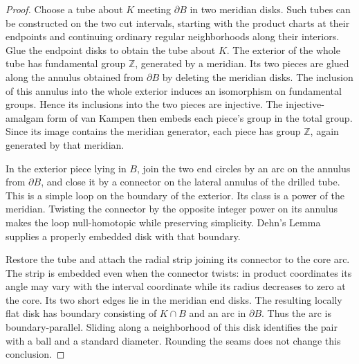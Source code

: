 \begin{proof}
Choose a tube about $K$ meeting $\partial B$ in two meridian disks.
Such tubes can be constructed on the two cut intervals, starting with
the product charts at their endpoints and continuing ordinary regular
neighborhoods along their interiors.  Glue the endpoint disks to obtain
the tube about $K$.  The exterior of the whole tube has fundamental
group $\mathbb Z$, generated by a meridian.  Its two pieces are glued
along the annulus obtained from $\partial B$ by deleting the meridian
disks.  The inclusion of this annulus into the whole exterior induces
an isomorphism on fundamental groups.  Hence its inclusions into the
two pieces are injective.  The injective-amalgam form of van Kampen
then embeds each piece's group in the total group.  Since its image
contains the meridian generator, each piece has group $\mathbb Z$,
again generated by that meridian.

In the exterior piece lying in $B$, join the two end circles by an arc
on the annulus from $\partial B$, and close it by a connector on the
lateral annulus of the drilled tube.  This is a simple loop on the
boundary of the exterior.  Its class is a power of the meridian.
Twisting the connector by the opposite integer power on its annulus
makes the loop null-homotopic while preserving simplicity.  Dehn's
Lemma supplies a properly embedded disk with that boundary.

Restore the tube and attach the radial strip joining its connector to
the core arc.  The strip is embedded even when the connector twists:
in product coordinates its angle may vary with the interval coordinate
while its radius decreases to zero at the core.  Its two short edges
lie in the meridian end disks.  The resulting locally flat disk has
boundary consisting of $K\cap B$ and an arc in $\partial B$.  Thus the
arc is boundary-parallel.  Sliding along a neighborhood of this disk
identifies the pair with a ball and a standard diameter.  Rounding the
seams does not change this conclusion.
\end{proof}

